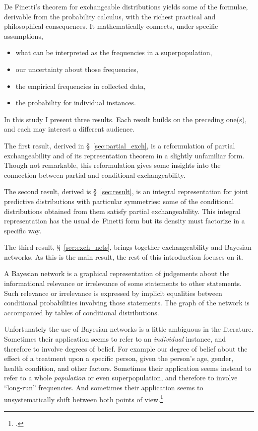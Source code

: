 \documentclass[\ifafour a4paper,12pt,\else a5paper,10pt,\fi%
onecolumn,oneside,article,%
british%
]{memoir}
\theoremstyle{remark}
\theoremstyle{innote}
\newcommand*{\citep}{\footcites}
\renewcommand*{\|}[1][]{\nonscript\,#1\vert\nonscript\,\mathopen{}}
\newcommand*{\sect}{\S}%
\newcommand*{\eg}{{e.g.}}
\renewcommand*{\=}{\TextOrMath\texteq\eq}
\begin{document}
De Finetti's theorem for exchangeable distributions yields some of the
formulae, derivable from the probability calculus, with the richest
practical and philosophical
consequences.%
It mathematically connects, under specific assumptions,
\begin{itemize}[nosep]
\item what can be interpreted as the frequencies in a superpopulation,
\item our uncertainty about those frequencies,
\item the empirical frequencies in collected data,
\item the probability for individual instances.
\end{itemize}

In this study I present three results. Each result builds on the preceding
one(s), and each may interest a different audience.

The first result, derived in \sect~\ref{sec:partial_exch}, is a
reformulation of partial exchangeability and of its representation theorem
in a slightly unfamiliar form. Though not remarkable, this reformulation
gives some insights into the connection between partial and conditional
exchangeability.

The second result, derived is \sect~\ref{sec:result}, is an integral
representation for joint predictive distributions with particular
symmetries: some of the conditional distributions obtained from them
satisfy partial exchangeability. This integral representation has the usual
de~Finetti form but its density must factorize in a specific way.

The third result, \sect~\ref{sec:exch_nets}, brings together
exchangeability and Bayesian networks. As this is the main result, the rest
of this introduction focuses on it.

A Bayesian network is a graphical representation of judgements about the
informational relevance or irrelevance of some statements to other
statements. Such relevance or irrelevance is expressed by implicit
equalities between conditional probabilities involving those statements.
The graph of the network is accompanied by tables of conditional
distributions.

Unfortunately the use of Bayesian networks is a little ambiguous in the
literature. Sometimes their application seems to refer to an
\emph{individual} instance, and therefore to involve degrees of belief. For
example our degree of belief about the effect of a treatment upon a
specific person, given the person's age, gender, health condition, and
other factors. Sometimes their application seems instead to refer to a
whole \emph{population} or even superpopulation, and therefore to involve
\enquote{long-run} frequencies. And sometimes their application seems to
unsystematically shift between both points of view.\citep[See
\eg][]{pearl2000_r2009,wiegerincketal2013}[the discussion by][is more
precise in this respect: they assume, for simplicity, a limit in which the
two problems become numerically similar]{lindleyetal1981}
\end{document}
